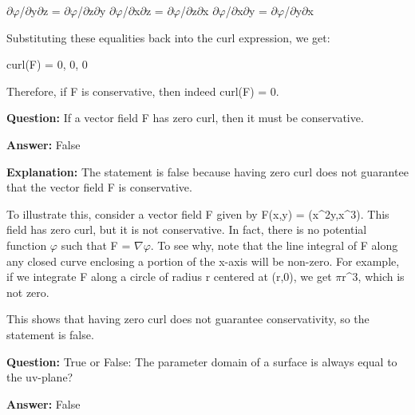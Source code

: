 \documentclass{article}
\begin{document}
\ensuremath{\partial}{\texttwosuperior}\ensuremath{\varphi}/\ensuremath{\partial}y\ensuremath{\partial}z = \ensuremath{\partial}{\texttwosuperior}\ensuremath{\varphi}/\ensuremath{\partial}z\ensuremath{\partial}y
\ensuremath{\partial}{\texttwosuperior}\ensuremath{\varphi}/\ensuremath{\partial}x\ensuremath{\partial}z = \ensuremath{\partial}{\texttwosuperior}\ensuremath{\varphi}/\ensuremath{\partial}z\ensuremath{\partial}x
\ensuremath{\partial}{\texttwosuperior}\ensuremath{\varphi}/\ensuremath{\partial}x\ensuremath{\partial}y = \ensuremath{\partial}{\texttwosuperior}\ensuremath{\varphi}/\ensuremath{\partial}y\ensuremath{\partial}x

Substituting these equalities back into the curl expression, we get:

curl(F) = 0, 0, 0

Therefore, if F is conservative, then indeed curl(F) = 0.
                
                \vspace{0.5cm} 
        
            
                \textbf {Question:} If a vector field F has zero curl, then it must be conservative.
                
                \textbf{Answer:} False

                \textbf{Explanation:} The statement is false because having zero curl does not guarantee that the vector field F is conservative.

To illustrate this, consider a vector field F given by F(x,y) = (x{\textasciicircum}2y,x{\textasciicircum}3). This field has zero curl, but it is not conservative. In fact, there is no potential function \ensuremath{\varphi} such that F = \ensuremath{\nabla}\ensuremath{\varphi}. To see why, note that the line integral of F along any closed curve enclosing a portion of the x-axis will be non-zero. For example, if we integrate F along a circle of radius r centered at (r,0), we get \ensuremath{\pi}r{\textasciicircum}3, which is not zero.

This shows that having zero curl does not guarantee conservativity, so the statement is false.
                
                \vspace{0.5cm} 
        
            
                \textbf {Question:} True or False: The parameter domain of a surface is always equal to the uv-plane?
                
                \textbf{Answer:} False
\end{document}
